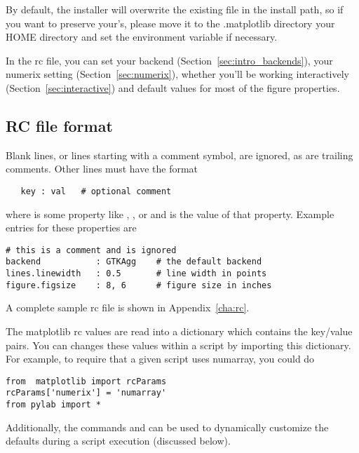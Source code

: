 \documentclass[twoside]{book}
\begin{document}
\noindent By default, the installer will overwrite the existing file in
the install path, so if you want to preserve your's, please move it to the .matplotlib directory
your HOME directory and set the environment variable if necessary.

In the rc file, you can set your backend (Section~\ref{sec:intro_backends}),
your numerix setting (Section~\ref{sec:numerix}), whether you'll be
working interactively (Section~\ref{sec:interactive}) and default
values for most of the figure properties.  


\subsection{RC file format}

Blank lines, or lines starting with a comment symbol, are ignored,
as are trailing comments.  Other lines must have the format

\begin{lstlisting}
   key : val   # optional comment
\end{lstlisting}

\noindent where  is some property like ,
, or  and  is the value
of that property.  Example entries for these properties are

\begin{lstlisting}
# this is a comment and is ignored
backend           : GTKAgg    # the default backend
lines.linewidth   : 0.5       # line width in points
figure.figsize    : 8, 6      # figure size in inches
\end{lstlisting}

\noindent A complete sample rc file is shown in Appendix~\ref{cha:rc}.

The matplotlib rc values are read into a dictionary  which
contains the key/value pairs.  You can changes these values within a
script by importing this dictionary.  For example, to require that a
given script uses numarray, you could do

\begin{lstlisting}
from  matplotlib import rcParams
rcParams['numerix'] = 'numarray'
from pylab import *
\end{lstlisting}

\noindent Additionally, the commands  and
 can be used to dynamically customize
the defaults during a script execution (discussed below).
\end{document}
